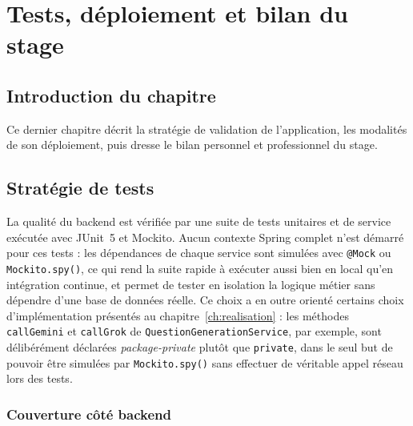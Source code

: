 \chapter{Tests, déploiement et bilan du stage}
\label{ch:tests-deploiement-bilan}

\section*{Introduction du chapitre}
Ce dernier chapitre décrit la stratégie de validation de l'application,
les modalités de son déploiement, puis dresse le bilan personnel et
professionnel du stage.

\section{Stratégie de tests}

La qualité du backend est vérifiée par une suite de tests unitaires et de
service exécutée avec JUnit~5 et Mockito. Aucun contexte Spring complet
n'est démarré pour ces tests : les dépendances de chaque service sont
simulées avec \texttt{@Mock} ou \texttt{Mockito.spy()}, ce qui rend la
suite rapide à exécuter aussi bien en local qu'en intégration continue, et
permet de tester en isolation la logique métier sans dépendre d'une base
de données réelle. Ce choix a en outre orienté certains choix
d'implémentation présentés au chapitre~\ref{ch:realisation} : les méthodes
\texttt{callGemini} et \texttt{callGrok} de
\texttt{QuestionGenerationService}, par exemple, sont délibérément
déclarées \emph{package-private} plutôt que \texttt{private}, dans le seul
but de pouvoir être simulées par \texttt{Mockito.spy()} sans effectuer de
véritable appel réseau lors des tests.

\subsection{Couverture côté backend}
\label{sec:tests-backend}

